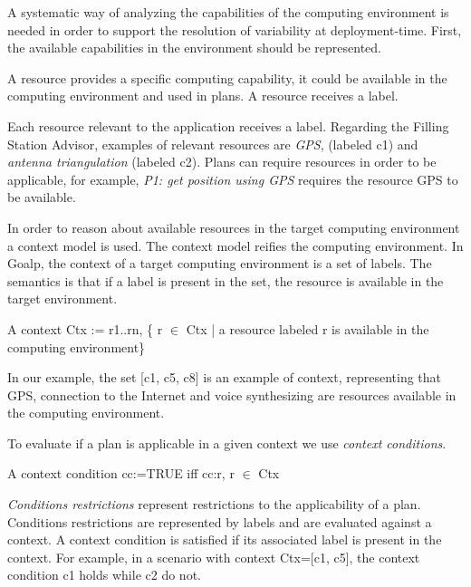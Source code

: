 A systematic way of analyzing the capabilities of the computing environment is needed in order to support the resolution of variability at deployment-time. First, the available capabilities in the environment should be represented.

\begin{defn}[Resource]

  A resource provides a specific computing capability, it could be available in the computing environment and used in plans. A resource receives a label.

\end{defn}

Each resource relevant to the application receives a label.
Regarding the Filling Station Advisor, examples of relevant resources are \emph{GPS}, (labeled c1) and \emph{antenna triangulation} (labeled c2). Plans can require resources in order to be applicable, for example, \emph{P1: get position using GPS} requires the resource GPS to be available.

In order to reason about available resources in the target computing environment a context model is used. The context model reifies the computing environment.
In Goalp, the context of a target computing environment is a set of labels. The semantics is that if a label is present in the set, the resource is available in the target environment.

\begin{defn}[Context]

  A context Ctx := r1..rn, \{ r $\in$ Ctx | a resource labeled r is available in the computing environment\}
\end{defn}

In our example, the set
[c1, c5, c8] is an example of context, representing that GPS, connection to the Internet and voice synthesizing are resources available in the computing environment.

To evaluate if a plan is applicable in a given context we use \emph{context conditions}.

\begin{defn}
  A context condition cc:=TRUE iff cc:r, r $\in$ Ctx
\end{defn}

\emph{Conditions restrictions} represent restrictions to the applicability of a plan. Conditions restrictions are represented by labels and are evaluated against a context.
A context condition is satisfied if its associated label is present in the context. For example, in a scenario with context Ctx=[c1, c5], the context condition c1 holds while c2 do not.

